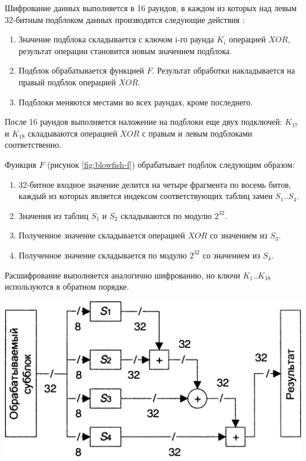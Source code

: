 Шифрование данных выполняется в 16 раундов, в каждом из которых над левым
32-битным подблоком данных производятся следующие действия \cite{blowfish}:
\begin{enumerate}
  \item Значение подблока складывается с ключом i-го раунда $K_i$ операцией
  $XOR$, результат операции становится новым значением подблока.
  \item Подблок обрабатывается функцией $F$. Результат обработки накладывается
  на правый подблок операцией $XOR$.
  \item Подблоки меняются местами во всех раундах, кроме последнего.
\end{enumerate}

После 16 раундов выполняется наложение на подблоки еще двух подключей:
$K_{17}$ и $K_{18}$ складываются операцией $XOR$ с правым и левым
подблоками соответственно.

Функция $F$ (рисунок \ref{fig:blowfish-f}) обрабатывает подблок следующим образом:
\begin{enumerate}
  \item 32-битное входное значение делится на четыре фрагмента по восемь битов,
  каждый из которых является индексом соответствующих таблиц замен $S_1..S_4$.
  \item Значения из таблиц $S_1$ и $S_2$ складываются по модулю $2^{32}$.
  \item Полученное значение складывается операцией $XOR$ со значением из $S_3$.
  \item Полученное значение складывается по модулю $2^{32}$ со значением из $S_4$.
\end{enumerate}

Расшифрование выполняется аналогично шифрованию, но ключи $K_1..K_{18}$
используются в обратном порядке.

\noindent
\begin{minipage}{\linewidth}
  \centering
  \vspace{3.5mm}
  \includegraphics[scale=0.2]{./pics/blowfish-f.png}
  \label{fig:blowfish-f}
  \vspace{3.5mm}
\end{minipage}

